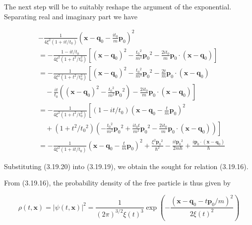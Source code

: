 \documentclass{article}
\begin{document}
The next step will be to suitably reshape the argument of the exponential.
Separating real and imaginary part we have
 
\begin{align*}
&- \frac{1}{4 \xi^{2}\left(1+i t / t_{0}\right)}\left(\boldsymbol{x}-\boldsymbol{q}_{0}-\frac{i t_{0}}{m} \boldsymbol{p}_{0}\right)^{2}  \tag{3.19.20}\\
&=-\frac{1-i t / t_{0}}{4 \xi^{2}\left(1+t^{2} / t_{0}^{2}\right)}\left[\left(\boldsymbol{x}-\boldsymbol{q}_{0}\right)^{2}-\frac{t_{0}{ }^{2}}{m^{2}} \boldsymbol{p}_{0}{ }^{2}-\frac{2 i t_{0}}{m} \boldsymbol{p}_{0} \cdot\left(\boldsymbol{x}-\boldsymbol{q}_{0}\right)\right] \\
&=-\frac{1}{4 \xi^{2}\left(1+t^{2} / t_{0}^{2}\right)}\left[\left(\boldsymbol{x}-\boldsymbol{q}_{0}\right)^{2}-\frac{t_{0}{ }^{2}}{m^{2}} \boldsymbol{p}_{0}{ }^{2}-\frac{2 t}{m} \boldsymbol{p}_{0} \cdot\left(\boldsymbol{x}-\boldsymbol{q}_{0}\right)\right. \\
&\left.\quad-\frac{i t}{t_{0}}\left(\left(\boldsymbol{x}-\boldsymbol{q}_{0}\right)^{2}-\frac{t_{0}{ }^{2}}{m^{2}} \boldsymbol{p}_{0}{ }^{2}\right)-\frac{2 i t_{0}}{m} \boldsymbol{p}_{0} \cdot\left(\boldsymbol{x}-\boldsymbol{q}_{0}\right)\right] \\
&=-\frac{1}{4 \xi^{2}\left(1+t^{2} / t_{0}^{2}\right)}\left[\left(1-i t / t_{0}\right)\left(\boldsymbol{x}-\boldsymbol{q}_{0}-\frac{t}{m} \boldsymbol{p}_{0}\right)^{2}\right. \\
&\left.\quad+\left(1+t^{2} / t_{0}{ }^{2}\right)\left(-\frac{t_{0}{ }^{2}}{m^{2}} \boldsymbol{p}_{0}{ }^{2}+\frac{i t_{0} t}{m^{2}} \boldsymbol{p}_{0}{ }^{2}-\frac{2 i t_{0}}{m} \boldsymbol{p}_{0} \cdot\left(\boldsymbol{x}-\boldsymbol{q}_{0}\right)\right)\right] \\
&=-\frac{1}{4 \xi^{2}\left(1+i t / t_{0}\right)}\left(\boldsymbol{x}-\boldsymbol{q}_{0}-\frac{t}{m} \boldsymbol{p}_{0}\right)^{2}+\frac{\xi^{2} \boldsymbol{p}_{0}{ }^{2}}{\hbar^{2}}-\frac{i t \boldsymbol{p}_{0}{ }^{2}}{2 m \hbar}+\frac{i \boldsymbol{p}_{0} \cdot\left(\boldsymbol{x}-\boldsymbol{q}_{0}\right)}{\hbar}
\end{align*}
 

Substituting (3.19.20) into (3.19.19), we obtain the sought for relation (3.19.16).

From (3.19.16), the probability density of the free particle is thus given by
 
\begin{equation*}
\rho(t, \boldsymbol{x})=|\psi(t, \boldsymbol{x})|^{2}=\frac{1}{(2 \pi)^{3 / 2} \xi(t)^{3}} \exp \left(-\frac{\left(\boldsymbol{x}-\boldsymbol{q}_{0}-t \boldsymbol{p}_{0} / m\right)^{2}}{2 \xi(t)^{2}}\right) \tag{3.19.21}
\end{equation*}
 
\end{document}
